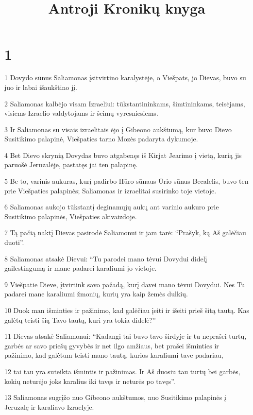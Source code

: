 

\title{Antroji Kronikų knyga}

\chapter{1}

\par 1 Dovydo sūnus Saliamonas įsitvirtino karalystėje, o Viešpats, jo Dievas, buvo su juo ir labai išaukštino jį. 
\par 2 Saliamonas kalbėjo visam Izraeliui: tūkstantininkams, šimtininkams, teisėjams, visiems Izraelio valdytojams ir šeimų vyresniesiems. 
\par 3 Ir Saliamonas su visais izraelitais ėjo į Gibeono aukštumą, kur buvo Dievo Susitikimo palapinė, Viešpaties tarno Mozės padaryta dykumoje. 
\par 4 Bet Dievo skrynią Dovydas buvo atgabenęs iš Kirjat Jearimo į vietą, kurią jis paruošė Jeruzalėje, pastatęs jai ten palapinę. 
\par 5 Be to, varinis aukuras, kurį padirbo Hūro sūnaus Ūrio sūnus Becalelis, buvo ten prie Viešpaties palapinės; Saliamonas ir izraelitai susirinko toje vietoje. 
\par 6 Saliamonas aukojo tūkstantį deginamųjų aukų ant varinio aukuro prie Susitikimo palapinės, Viešpaties akivaizdoje. 
\par 7 Tą pačią naktį Dievas pasirodė Saliamonui ir jam tarė: “Prašyk, ką Aš galėčiau duoti”. 
\par 8 Saliamonas atsakė Dievui: “Tu parodei mano tėvui Dovydui didelį gailestingumą ir mane padarei karaliumi jo vietoje. 
\par 9 Viešpatie Dieve, įtvirtink savo pažadą, kurį davei mano tėvui Dovydui. Nes Tu padarei mane karaliumi žmonių, kurių yra kaip žemės dulkių. 
\par 10 Duok man išminties ir pažinimo, kad galėčiau įeiti ir išeiti prieš šitą tautą. Kas galėtų teisti šią Tavo tautą, kuri yra tokia didelė?” 
\par 11 Dievas atsakė Saliamonui: “Kadangi tai buvo tavo širdyje ir tu neprašei turtų, garbės ar savo priešų gyvybės ir net ilgo amžiaus, bet prašei išminties ir pažinimo, kad galėtum teisti mano tautą, kurios karaliumi tave padariau, 
\par 12 tai tau yra suteikta išmintis ir pažinimas. Ir Aš duosiu tau turtų bei garbės, kokių neturėjo joks karalius iki tavęs ir neturės po tavęs”. 
\par 13 Saliamonas sugrįžo nuo Gibeono aukštumos, nuo Susitikimo palapinės į Jeruzalę ir karaliavo Izraelyje. 
